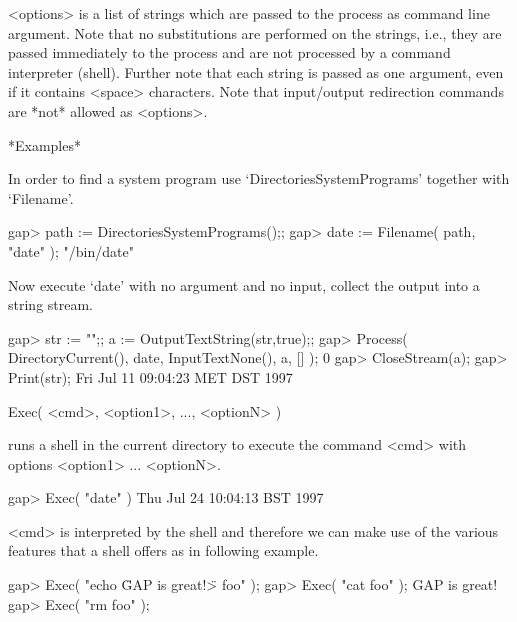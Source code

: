 <options> is a list of strings which are passed to the process as command
line argument.  Note that no substitutions are  performed on the strings,
i.e., they are passed immediately to the process and are not processed by
a command interpreter (shell).   Further note that  each string is passed
as one  argument,  even if it  contains  <space>  characters.  Note  that
input/output redirection commands are *not* allowed as <options>.

*Examples*

In   order to  find   a  system program  use  `DirectoriesSystemPrograms'
together with `Filename'.

\begintt
   gap> path := DirectoriesSystemPrograms();;
   gap> date := Filename( path, "date" );
   "/bin/date"
\endtt

Now execute `date' with no argument and no input, collect the output into
a string stream.

\begintt
    gap> str := "";; a := OutputTextString(str,true);;
    gap> Process( DirectoryCurrent(), date, InputTextNone(), a, [] );
    0
    gap> CloseStream(a);
    gap> Print(str);   
    Fri Jul 11 09:04:23 MET DST 1997
\endtt


\>Exec( <cmd>, <option1>, ..., <optionN> )

runs a shell in the  current directory to execute  the command <cmd> with
options <option1> ... <optionN>.

\begintt
    gap> Exec( "date" )
    Thu Jul 24 10:04:13 BST 1997
\endtt

<cmd> is  interpreted by the shell  and therefore we  can make use of the
various features that a shell offers as in following example.

\beginexample
   gap> Exec( "echo \"GAP is great!\" > foo" );    
   gap> Exec( "cat foo" );
   GAP is great!
   gap> Exec( "rm foo" );
\endexample

